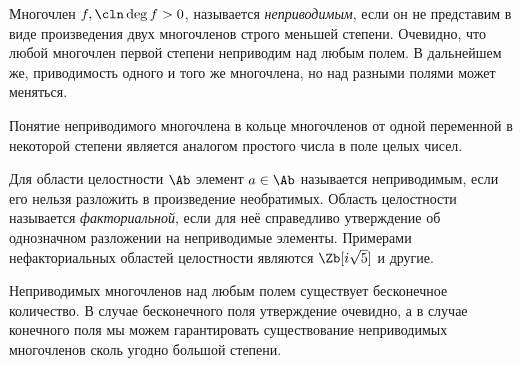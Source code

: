 \begin{df}
  Многочлен $f,\cln\deg f>0$, называется \emph{неприводимым}, если он не представим в виде произведения двух многочленов строго меньшей степени. Очевидно, что любой многочлен первой степени неприводим над любым полем. В дальнейшем же, приводимость одного и того же многочлена, но над разными полями может меняться.

  Понятие неприводимого многочлена в кольце многочленов от одной переменной в некоторой степени является аналогом простого числа в поле целых чисел.

  Для области целостности $\Ab$ элемент $a\in\Ab$ называется неприводимым, если его нельзя разложить в произведение необратимых. Область целостности называется \emph{факториальной}, если для неё справедливо утверждение об однозначном разложении на неприводимые элементы. Примерами нефакториальных областей целостности являются %
$\Zb[i\sqrt{5}]$ и другие.
\end{df}

Неприводимых многочленов над любым полем существует бесконечное количество. В случае бесконечного поля утверждение очевидно, а в случае конечного поля мы можем гарантировать существование неприводимых многочленов сколь угодно большой степени.

